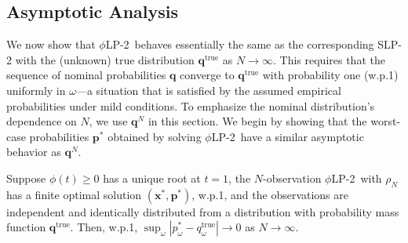 \documentclass[opre,nonblindrev]{informs3} %
\newcommand{\x}{\mathbf{x}}
\newcommand{\q}{\mathbf{q}}
\newcommand{\p}{\mathbf{p}}
\newcommand{\qtrue}{\q^{\text{true}}}
\newcommand{\plp}{$\phi$LP-2}
\begin{document}
\subsection{Asymptotic Analysis}
\label{ssec:epiconvergence}

We now show that \plp\ behaves essentially the same as the corresponding SLP-2 with the (unknown) true distribution $\qtrue$ as $N\rightarrow \infty$. 
This requires that the sequence of nominal probabilities $\q$ converge to $\qtrue$ with probability one (w.p.1) uniformly in $\omega$---a situation that is satisfied by the assumed empirical probabilities under mild conditions.
To emphasize the nominal distribution's dependence on $N$, we use $\q^N$ in this section. 
We begin by showing that the worst-case probabilities $\p^*$ obtained by solving  \plp\ have a similar asymptotic behavior as $\q^N$. 


\begin{proposition} \label{prop:weak_conv}
	Suppose $\phi(t) \geq 0$ has a unique root at $t = 1$, the $N$-observation \plp\ with $\rho_N$ has a finite optimal solution $(\x^*, \p^*)$, w.p.1, and the observations are independent and identically distributed from a distribution with probability mass function $\qtrue$. 
	Then, w.p.1, $\sup_\omega |p^*_{\omega} - q^{\text{true}}_\omega| \rightarrow 0$ as $N \rightarrow \infty$. 
\end{proposition}
\end{document}
